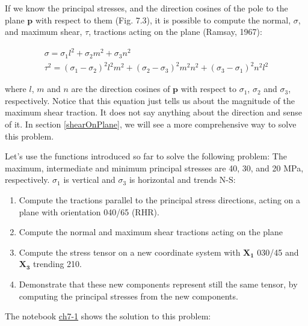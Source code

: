 \documentclass[a4paper , 12pt]{book}
\begin{document}
If we know the principal stresses, and the direction cosines of the pole to the plane $\mathbf{p}$  with respect to them (Fig. 7.3), it is possible to compute the normal, $\sigma$, and maximum shear, $\tau$, tractions acting on the plane (Ramsay, 1967):

\begin{equation}
    \begin{gathered}
        \sigma=\sigma_{1} l^{2}+\sigma_{2} m^{2}+\sigma_{3} n^{2} \\
        \tau^{2}=\left(\sigma_{1}-\sigma_{2}\right)^{2} l^{2} m^{2}+\left(\sigma_{2}-\sigma_{3}\right)^{2} m^{2} n^{2}+\left(\sigma_{3}-\sigma_{1}\right)^{2} n^{2} l^{2}
    \end{gathered}
\end{equation}

where $l$, $m$ and $n$ are the direction cosines of $\mathbf{p}$ with respect to $\sigma_1$, $\sigma_2$ and $\sigma_3$, respectively. Notice that this equation just tells us about the magnitude of the maximum shear traction. It does not say anything about the direction and sense of it. In section \ref{shearOnPlane}, we will see a more comprehensive way to solve this problem.

Let's use the functions introduced so far to solve the following problem: The maximum, intermediate and minimum principal stresses are 40, 30, and 20 MPa, respectively. $\sigma_1$ is vertical and $\sigma_3$ is horizontal and trends N-S:

\begin{enumerate}
    \item Compute the tractions parallel to the principal stress directions, acting on a plane with orientation 040/65 (RHR).
    \item Compute the normal and maximum shear tractions acting on the plane
    \item Compute the stress tensor on a new coordinate system with $\mathbf{X_1}$ 030/45 and $\mathbf{X_3}$ trending 210.
    \item Demonstrate that these new components represent still the same tensor, by computing the principal stresses from the new components.
\end{enumerate}

The notebook \href{https://github.com/nfcd/compGeo/blob/master/source/notebooks/ch7-1.ipynb}{ch7-1} shows the solution to this problem:
\end{document}
